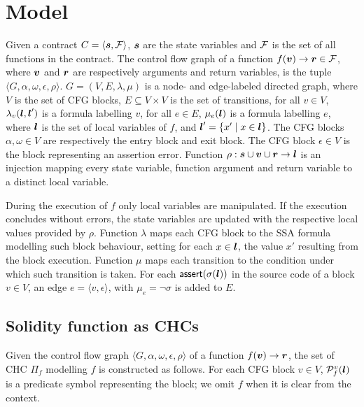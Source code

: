 \section{Model}

Given a contract $C=\langle\boldsymbol{s},\mathcal{F}\rangle$,
$\boldsymbol{s}$ are the state variables and $\mathcal{F}$ is
the set of all functions in the contract.
The control flow graph of a function 
\mbox{$f(\boldsymbol{v})\rightarrow\boldsymbol{r}\in\mathcal{F}$},
where $\boldsymbol{v}$ and $\boldsymbol{r}$ are respectively arguments and
return variables,
is the tuple \mbox{$\langle G,\alpha,\omega,\epsilon,\rho\rangle$}.
\mbox{$G=(V,E,\lambda,\mu)$} 
is a node- and edge-labeled directed graph,
where $V$ is the set of CFG blocks, 
\mbox{$E\subseteq V\times V$} is the set of transitions,
for all $v\in V$, $\lambda_v(\boldsymbol{l},
\boldsymbol{l}')$ is a formula labelling $v$,
for all $e\in E$, $\mu_e(\boldsymbol{l})$ is a formula labelling $e$,
where
\mbox{$\boldsymbol{l}$} is the set of local 
variables of $f$, and \mbox{$\boldsymbol{l}'=\{x'\mid x\in\boldsymbol{l}\}$}. 
The CFG blocks $\alpha,\omega\in V$ are respectively the entry 
block and exit block. The CFG block $\epsilon\in V$ is the block
representing an assertion error.
Function \mbox{$\rho:\boldsymbol{s}\cup\boldsymbol{v}\cup\boldsymbol{r}\rightarrow\boldsymbol{l}$} is 
an injection mapping every state variable, function 
argument and return variable to a distinct local variable. 

During the execution of $f$ only local variables are manipulated. If
the execution concludes without errors, the state variables
are updated with the respective local values
provided by $\rho$.
%
Function $\lambda$ maps each CFG block to 
the SSA formula modelling such block behaviour, setting for each 
$x\in\boldsymbol{l}$, the value $x'$ resulting from the block
execution. 
Function $\mu$ maps each transition to the condition 
under which such transition is taken.
For each \mbox{$\mathsf{assert}(\sigma(\boldsymbol{l}))$} in the 
source code of a block $v\in V$, an edge 
\mbox{$e=\langle v,\epsilon\rangle$}, with \mbox{$\mu_e=\neg\sigma$}
is added to $E$.

\subsection{Solidity function as CHCs}
Given the control flow graph 
\mbox{$\langle G,\alpha,\omega,\epsilon,\rho\rangle$} 
of a function $f(\boldsymbol{v})\rightarrow\boldsymbol{r}$, the set of CHC $\Pi_f$ modelling $f$ 
is constructed
as follows. 
%
For each CFG block $v\in V$, $\mathcal{P}_f^v(\boldsymbol{l})$ 
is a predicate symbol representing the block; we
omit $f$ when it is clear from the context.

